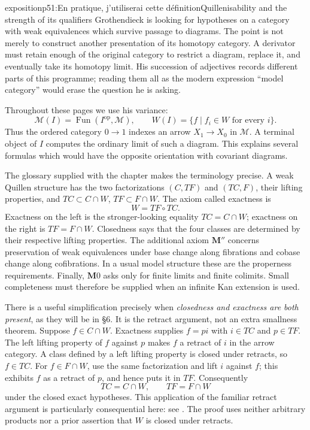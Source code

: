 \begin{dcomment}{exposition}{p51:En pratique, j'utiliserai cette définition}{Quillenisability and the strength of its qualifiers}
Grothendieck is looking for hypotheses on a category with weak equivalences which survive passage to diagrams. The point is not merely to construct another presentation of its homotopy category. A derivator must retain enough of the original category to restrict a diagram, replace it, and eventually take its homotopy limit. His succession of adjectives records different parts of this programme; reading them all as the modern expression ``model category'' would erase the question he is asking.

Throughout these pages we use his variance:
\[
 \mathcal M(I)=\operatorname{Fun}(I^{\mathrm{op}},\mathcal M),
 \qquad W(I)=\{f\mid f_i\in W\text{ for every }i\}.
\]
Thus the ordered category $0\to1$ indexes an arrow $X_1\to X_0$ in $\mathcal M$. A terminal object of $I$ computes the ordinary limit of such a diagram. This explains several formulas which would have the opposite orientation with covariant diagrams.

The glossary supplied with the chapter makes the terminology precise. A weak Quillen structure has the two factorizations $(C,TF)$ and $(TC,F)$, their lifting properties, and $TC\subset C\cap W$, $TF\subset F\cap W$. The axiom called exactness is
\[
                         W=TF\circ TC.
\]
Exactness on the left is the stronger-looking equality $TC=C\cap W$; exactness on the right is $TF=F\cap W$. Closedness says that the four classes are determined by their respective lifting properties. The additional axiom $\mathbf M''$ concerns preservation of weak equivalences under base change along fibrations and cobase change along cofibrations. In a usual model structure these are the properness requirements. Finally, $\mathbf M0$ asks only for finite limits and finite colimits. Small completeness must therefore be supplied when an infinite Kan extension is used.

There is a useful simplification precisely when \emph{closedness and exactness are both present}, as they will be in \S6. It is the retract argument, not an extra smallness theorem. Suppose $f\in C\cap W$. Exactness supplies $f=pi$ with $i\in TC$ and $p\in TF$. The left lifting property of $f$ against $p$ makes $f$ a retract of $i$ in the arrow category. A class defined by a left lifting property is closed under retracts, so $f\in TC$. For $f\in F\cap W$, use the same factorization and lift $i$ against $f$; this exhibits $f$ as a retract of $p$, and hence puts it in $TF$. Consequently
\[
              TC=C\cap W,\qquad TF=F\cap W
\]
under the closed exact hypotheses. This application of the familiar retract argument is particularly consequential here: see \citet[Lemma 1.1.9]{Hovey1999}. The proof uses neither arbitrary products nor a prior assertion that $W$ is closed under retracts.


\end{dcomment}
